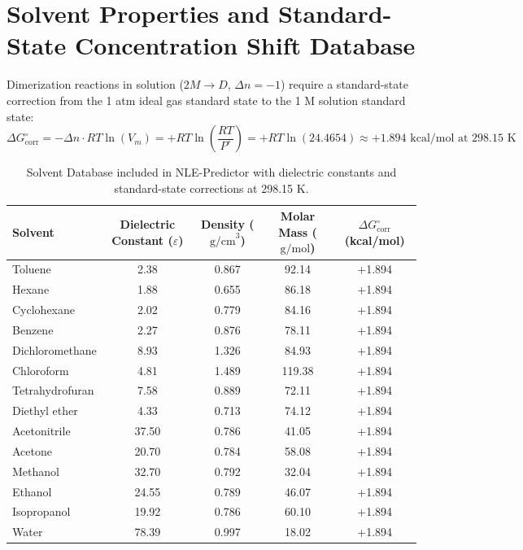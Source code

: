 \documentclass[11pt,a4paper]{article}
\begin{document}
\section{Solvent Properties and Standard-State Concentration Shift Database}

Dimerization reactions in solution ($2 M \to D$, $\Delta n = -1$) require a standard-state correction from the 1 atm ideal gas standard state to the 1 M solution standard state:
\begin{equation}
\Delta G^\circ_{\text{corr}} = -\Delta n \cdot RT \ln(V_m) = +RT \ln\left( \frac{RT}{P^\circ} \right) = +RT \ln(24.4654) \approx +1.894\text{ kcal/mol at } 298.15\text{ K}
\end{equation}

\begin{table}[htbp]
\centering
\caption{Solvent Database included in NLE-Predictor with dielectric constants and standard-state corrections at 298.15 K.}
\label{tab:solvents}
\begin{tabular}{lcccc}
\toprule
\textbf{Solvent} & \textbf{Dielectric Constant ($\varepsilon$)} & \textbf{Density ($\text{g/cm}^3$)} & \textbf{Molar Mass ($\text{g/mol}$)} & \textbf{$\Delta G^\circ_{\text{corr}}$ (kcal/mol)} \\
\midrule
Toluene           & 2.38  & 0.867 & 92.14  & +1.894 \\
Hexane            & 1.88  & 0.655 & 86.18  & +1.894 \\
Cyclohexane       & 2.02  & 0.779 & 84.16  & +1.894 \\
Benzene           & 2.27  & 0.876 & 78.11  & +1.894 \\
Dichloromethane   & 8.93  & 1.326 & 84.93  & +1.894 \\
Chloroform        & 4.81  & 1.489 & 119.38 & +1.894 \\
Tetrahydrofuran   & 7.58  & 0.889 & 72.11  & +1.894 \\
Diethyl ether     & 4.33  & 0.713 & 74.12  & +1.894 \\
Acetonitrile      & 37.50 & 0.786 & 41.05  & +1.894 \\
Acetone           & 20.70 & 0.784 & 58.08  & +1.894 \\
Methanol          & 32.70 & 0.792 & 32.04  & +1.894 \\
Ethanol           & 24.55 & 0.789 & 46.07  & +1.894 \\
Isopropanol       & 19.92 & 0.786 & 60.10  & +1.894 \\
Water             & 78.39 & 0.997 & 18.02  & +1.894 \\
\bottomrule
\end{tabular}
\end{table}
\end{document}
